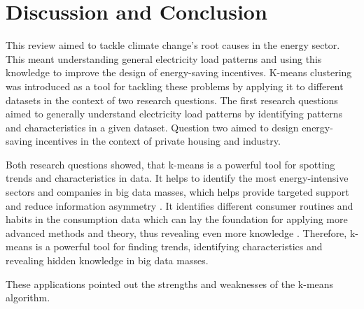 


\section{Discussion and Conclusion}
\label{cha:discussionAndConclusion}

This review aimed to tackle climate change's root causes in the energy sector.
This meant understanding general electricity load patterns and using this knowledge to improve the design of energy-saving incentives.
K-means clustering was introduced as a tool for tackling these problems by applying it to different datasets in the context of two research questions.
The first research questions aimed to generally understand electricity load patterns by identifying patterns and characteristics in a given dataset.
Question two aimed to design energy-saving incentives in the context of private housing and industry.

Both research questions showed, that k-means is a powerful tool for spotting trends and characteristics in data.
It helps to identify the most energy-intensive sectors and companies in big data masses, which helps provide targeted support and reduce information asymmetry \cite{LIU-BDE}.
It identifies different consumer routines and habits in the consumption data which can lay the foundation for applying more advanced methods and theory, thus revealing even more knowledge \cite{MAL-HBP}.
Therefore, k-means is a powerful tool for finding trends, identifying characteristics and revealing hidden knowledge in big data masses.

These applications pointed out the strengths and weaknesses of the k-means algorithm.

